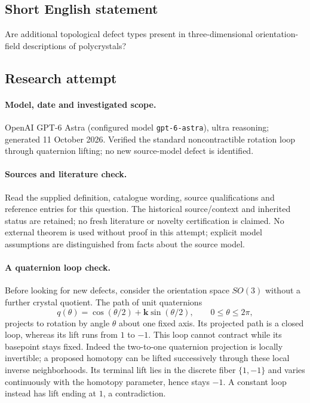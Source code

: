 \documentclass[11pt]{article}
\begin{document}
\subsection{Short English statement}
Are additional topological defect types present in three-dimensional orientation-field descriptions of polycrystals?
\subsection{Research attempt}
\paragraph{Model, date and investigated scope.}
OpenAI GPT-6 Astra (configured model \texttt{gpt-6-astra}), ultra reasoning; generated 11 October 2026. Verified the standard noncontractible rotation loop through quaternion lifting; no new source-model defect is identified.

\paragraph{Sources and literature check.}
Read the supplied definition, catalogue wording, source qualifications and reference entries for this question. The historical source/context and inherited status are retained; no fresh literature or novelty certification is claimed. No external theorem is used without proof in this attempt; explicit model assumptions are distinguished from facts about the source model.

\paragraph{A quaternion loop check.} Before looking for new defects, consider the orientation space \(SO(3)\) without a further crystal quotient. The path of unit quaternions
\[
 q(\theta)=\cos(\theta/2)+\mathbf k\sin(\theta/2),\qquad0\le\theta\le2\pi,
\]
projects to rotation by angle \(\theta\) about one fixed axis. Its projected path is a closed loop, whereas its lift runs from \(1\) to \(-1\). This loop cannot contract while its basepoint stays fixed. Indeed the two-to-one quaternion projection is locally invertible; a proposed homotopy can be lifted successively through these local inverse neighborhoods. Its terminal lift lies in the discrete fiber \(\{1,-1\}\) and varies continuously with the homotopy parameter, hence stays \(-1\). A constant loop instead has lift ending at \(1\), a contradiction.
\end{document}
